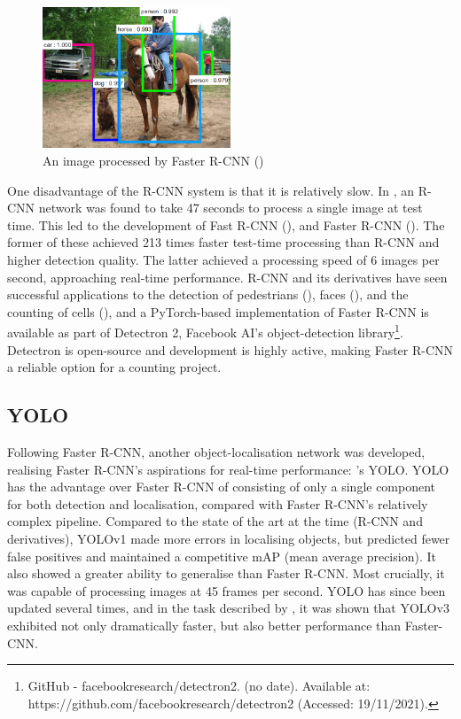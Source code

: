 \begin{figure}[h!]
	\centering
	\includegraphics[width=0.5\textwidth]{images/02Background/rcnn.png}
	\caption{An image processed by Faster R-CNN (\cite{ren2016faster})}
\end{figure}

One disadvantage of the R-CNN system is that it is relatively slow. In \cite{girshick2015fast}, an R-CNN network was found to take 47 seconds to process a single image at test time. This led to the development of Fast R-CNN (\cite{girshick2015fast}), and Faster R-CNN (\cite{ren2016faster}). The former of these achieved 213 times faster test-time processing than R-CNN and higher detection quality. The latter achieved a processing speed of 6 images per second, approaching real-time performance. R-CNN and its derivatives have seen successful applications to the detection of pedestrians (\cite{Fast-CNN-Pedestrians}), faces (\cite{Fast-R-CNN-Faces}), and the counting of cells (\cite{Identification-and-enumeration-of-cyanobacteria}), and a PyTorch-based implementation of Faster R-CNN is available as part of Detectron 2, Facebook AI's object-detection library\footnote{GitHub - facebookresearch/detectron2. (no date). Available at: https://github.com/facebookresearch/detectron2 (Accessed: 19/11/2021).}. Detectron is open-source and development is highly active, making Faster R-CNN a reliable option for a counting project.

\subsection{YOLO}
Following Faster R-CNN, another object-localisation network was developed, realising Faster R-CNN's aspirations for real-time performance: \cite{redmon2016look}'s YOLO. YOLO has the advantage over Faster R-CNN of consisting of only a single component for both detection and localisation, compared with Faster R-CNN's relatively complex pipeline. Compared to the state of the art at the time (R-CNN and derivatives), YOLOv1 made more errors in localising objects, but predicted fewer false positives and maintained a competitive mAP (mean average precision). It also showed a greater ability to generalise than Faster R-CNN. Most crucially, it was capable of processing images at 45 frames per second. YOLO has since been updated several times, and in the task described by \cite{benjdira2018car}, it was shown that YOLOv3 exhibited not only dramatically faster, but also better performance than Faster-CNN.\\

